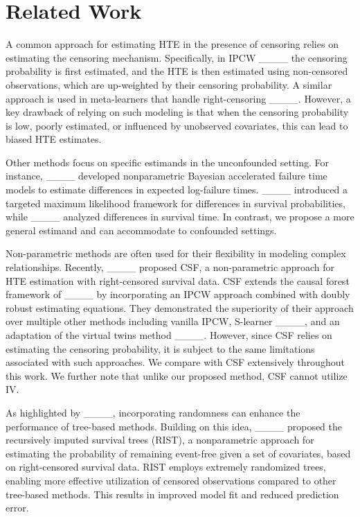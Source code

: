 \section{Related Work}
A common approach for estimating HTE in the presence of censoring relies on estimating the censoring mechanism. Specifically, in IPCW ____ the censoring probability is first estimated, and the HTE is then estimated using non-censored observations, which are up-weighted by their censoring probability. A similar approach is used in meta-learners that handle right-censoring ____. However, a key drawback of relying on such modeling is that when the censoring probability is low, poorly estimated, or influenced by unobserved covariates, this can lead to biased HTE estimates.

Other methods focus on  specific estimands in the unconfounded setting. For instance, ____ developed nonparametric Bayesian accelerated failure time models to estimate differences in expected log-failure times. ____ introduced a targeted maximum likelihood framework for differences in survival probabilities, while ____ analyzed differences in survival time. In contrast, we propose a more general estimand and can accommodate to confounded settings. 

Non-parametric methods are often used for their flexibility in modeling complex relationships. Recently, ____ proposed CSF, a non-parametric approach for HTE estimation with right-censored survival data. CSF extends the causal forest framework of ____ by incorporating an IPCW approach combined with doubly robust estimating equations. They demonstrated the superiority of their approach over multiple other methods including vanilla IPCW, S-learner ____, and an adaptation of the virtual twins method ____. However, since CSF relies on estimating the censoring probability, it is subject to the same limitations associated with such approaches. We compare with CSF extensively throughout this work. We further note that unlike our proposed method, CSF cannot utilize IV. 



As highlighted by ____, incorporating randomness can enhance the performance of tree-based methods. Building on this idea, ____ proposed the recursively imputed survival trees (RIST), a nonparametric approach for estimating the probability of remaining event-free given a set of covariates, based on right-censored survival data. RIST employs extremely randomized trees, enabling more effective utilization of censored observations compared to other tree-based methods. This results in improved model fit and reduced prediction error.

